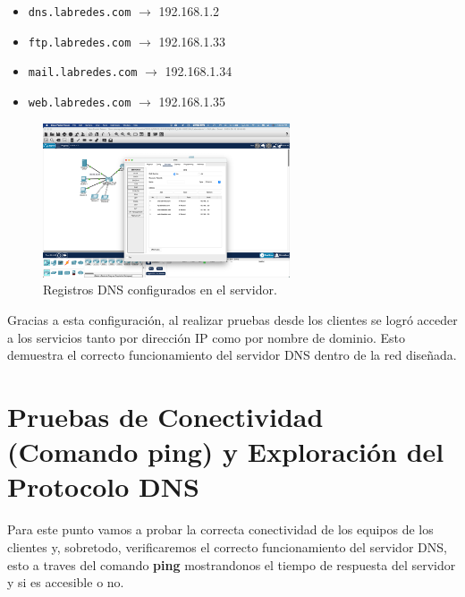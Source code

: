 \documentclass[10pt]{article}
\begin{document}
\begin{itemize}
    \item \texttt{dns.labredes.com} $\rightarrow$ 192.168.1.2
    \item \texttt{ftp.labredes.com} $\rightarrow$ 192.168.1.33
    \item \texttt{mail.labredes.com} $\rightarrow$ 192.168.1.34
    \item \texttt{web.labredes.com} $\rightarrow$ 192.168.1.35
\end{itemize}

\begin{figure}[H]
    \centering
    \includegraphics[width=0.65\textwidth]{lab-01-screenshots/42-1-DNS-config.png}
    \caption{Registros DNS configurados en el servidor.}
\end{figure}

\bigskip
Gracias a esta configuración, al realizar pruebas desde los clientes se logró acceder a los servicios tanto por dirección IP como por nombre de dominio. Esto demuestra el correcto funcionamiento del servidor DNS dentro de la red diseñada.

\section{Pruebas de Conectividad (Comando ping) y Exploración del Protocolo DNS}

Para este punto vamos a probar la correcta conectividad de los equipos de los clientes y, sobretodo, verificaremos el correcto funcionamiento del servidor DNS, esto a traves del comando \textbf{ping} mostrandonos el tiempo de respuesta del servidor y si es accesible o no.
\end{document}
